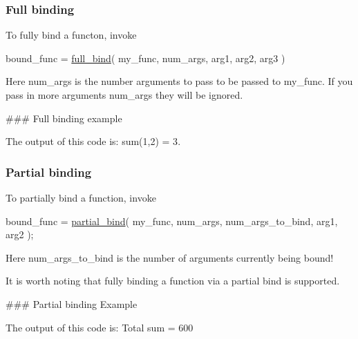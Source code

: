 \subsubsection*{Full binding}

To fully bind a functon, invoke 
\begin{DoxyCode}
bound\_func = \hyperlink{bind_8c_a31fdc3dfcbd70d3f32f4e3c8a2084c6a}{full\_bind}( my\_func, num\_args, arg1, arg2, arg3 )
\end{DoxyCode}
 Here {\ttfamily num\+\_\+args} is the number arguments to pass to be passed to {\ttfamily my\+\_\+func}. If you pass in more arguments {\ttfamily num\+\_\+args} they will be ignored.

\#\#\# Full binding example 
 The output of this code is\+: {\ttfamily sum(1,2) = 3}.

\subsubsection*{Partial binding}

To partially bind a function, invoke 
\begin{DoxyCode}
bound\_func = \hyperlink{bind_8c_a187e674be73b611c4e8d97345192757a}{partial\_bind}( my\_func, num\_args, num\_args\_to\_bind, arg1, arg2 );
\end{DoxyCode}
 Here {\ttfamily num\+\_\+args\+\_\+to\+\_\+bind} is the number of arguments currently being bound!

It is worth noting that fully binding a function via a partial bind is supported.

\#\#\# Partial binding Example 
 The output of this code is\+: {\ttfamily Total sum = 600}

